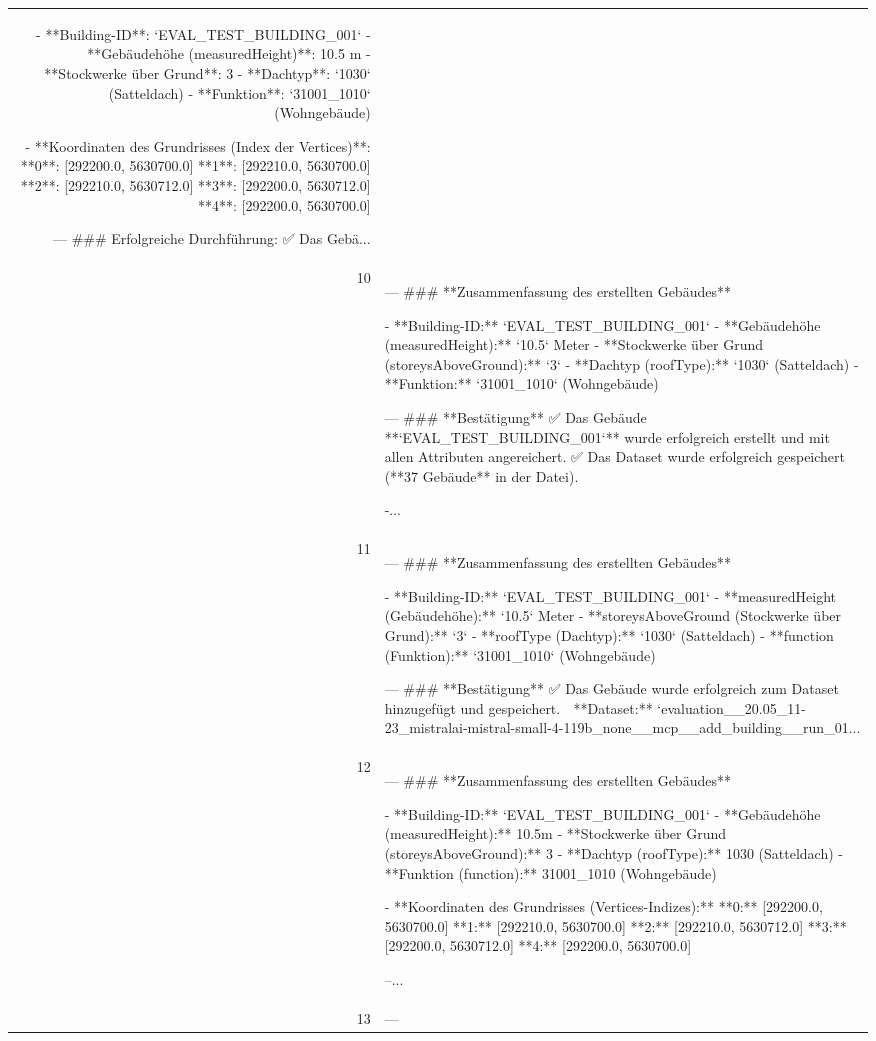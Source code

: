 \documentclass[a4paper,11pt]{article}
\begin{document}
\begin{table}[ht]
\begin{tabular}{r p{12cm}}
- **Building-ID**: `EVAL\_TEST\_BUILDING\_001`
- **Gebäudehöhe (measuredHeight)**: 10.5 m
- **Stockwerke über Grund**: 3
- **Dachtyp**: `1030` (Satteldach)
- **Funktion**: `31001\_1010` (Wohngebäude)

- **Koordinaten des Grundrisses (Index der Vertices)**:
  **0**: [292200.0, 5630700.0]
  **1**: [292210.0, 5630700.0]
  **2**: [292210.0, 5630712.0]
  **3**: [292200.0, 5630712.0]
  **4**: [292200.0, 5630700.0]

---
\#\#\# Erfolgreiche Durchführung:
✅ Das Gebä... \\
10 & ---
\#\#\# **Zusammenfassung des erstellten Gebäudes**

- **Building-ID:** `EVAL\_TEST\_BUILDING\_001`
- **Gebäudehöhe (measuredHeight):** `10.5` Meter
- **Stockwerke über Grund (storeysAboveGround):** `3`
- **Dachtyp (roofType):** `1030` (Satteldach)
- **Funktion:** `31001\_1010` (Wohngebäude)

---
\#\#\# **Bestätigung**
✅ Das Gebäude **`EVAL\_TEST\_BUILDING\_001`** wurde erfolgreich erstellt und mit allen Attributen angereichert.
✅ Das Dataset wurde erfolgreich gespeichert (**37 Gebäude** in der Datei).

-... \\
11 & ---
\#\#\# **Zusammenfassung des erstellten Gebäudes**

- **Building-ID:** `EVAL\_TEST\_BUILDING\_001`
- **measuredHeight (Gebäudehöhe):** `10.5` Meter
- **storeysAboveGround (Stockwerke über Grund):** `3`
- **roofType (Dachtyp):** `1030` (Satteldach)
- **function (Funktion):** `31001\_1010` (Wohngebäude)

---
\#\#\# **Bestätigung**
✅ Das Gebäude wurde erfolgreich zum Dataset hinzugefügt und gespeichert.
📁 **Dataset:** `evaluation\_\_20.05\_11-23\_mistralai-mistral-small-4-119b\_none\_\_mcp\_\_add\_building\_\_run\_01... \\
12 & ---
\#\#\# **Zusammenfassung des erstellten Gebäudes**

- **Building-ID:** `EVAL\_TEST\_BUILDING\_001`
- **Gebäudehöhe (measuredHeight):** 10.5m
- **Stockwerke über Grund (storeysAboveGround):** 3
- **Dachtyp (roofType):** 1030 (Satteldach)
- **Funktion (function):** 31001\_1010 (Wohngebäude)

- **Koordinaten des Grundrisses (Vertices-Indizes):**
  **0:** [292200.0, 5630700.0]
  **1:** [292210.0, 5630700.0]
  **2:** [292210.0, 5630712.0]
  **3:** [292200.0, 5630712.0]
  **4:** [292200.0, 5630700.0]

--... \\
13 & ---


\end{tabular}
\end{table}
\end{document}
